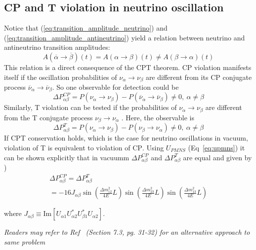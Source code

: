 \subsection{CP and \textsc{T} violation in neutrino oscillation}

Notice that (\ref{eq:transition_amplitude_neutrino}) and (\ref{eq:transition_amplitude_antineutrino}) yield a relation between neutrino and antineutrino transition amplitudes:
\begin{equation}
   A(\overline {\alpha} \to \overline {\beta})(t) =  A(\alpha \to \beta)(t)\not = A(\beta \to \alpha)(t)
\end{equation}
This relation is a direct consequence of the \textsc{CPT} theorem. \textsc{CP} violation manifests itself if the oscillation probabilities of \(\nu _{\alpha} \to \nu _\beta\) are different from its \textsc{CP} conjugate process \(\overline {\nu} _{\alpha} \to \overline {\nu} _\beta\). So one observable for detection could be
\begin{equation}
    \Delta P^{CP} _ {\alpha\beta} = P(\nu _\alpha \to \nu _\beta) - P(\overline {\nu} _{\alpha} \to \overline {\nu} _\beta) \not = 0, ~ \alpha \not = \beta
\end{equation}
Similarly, \textsc{T} violation can be tested if the probabilities of  \(\nu _{\alpha} \to \nu _\beta\)
are different from the  \textsc{T} conjugate process  \(\nu _{\beta} \to \nu _\alpha\) . Here, the observable is
\begin{equation}
    \Delta P^{T} _ {\alpha\beta} = P(\nu _\alpha \to \nu _\beta) - P(\nu _{\beta} \to \nu _\alpha) \not = 0, ~ \alpha \not = \beta
\end{equation}
If \textsc{CPT} conservation holds, which is the case for neutrino oscillations in vacuum, violation of \textsc{T}  is equivalent to violation of \textsc{CP}. Using \(U_{PMNS}\) (Eq~\ref{eq:upmns}) it can be shown explicitly that in vacuumm \(\Delta P^{CP} _ {\alpha\beta}\) and \(\Delta P^{T} _ {\alpha\beta}\) are equal and given by \cite{zuber2020neutrino})
\begin{equation}
    \begin{gathered}
        \Delta P^{CP} _ {\alpha\beta} = \Delta P^{T} _ {\alpha\beta}\\
        = - 16 J_{\alpha\beta} \sin \left(\frac{\Delta m^2 _{12}}{4E} L\right)\sin \left(\frac{\Delta m^2 _{23}}{4E} L\right)\sin \left(\frac{\Delta m^2 _{13}}{4E} L\right)
    \end{gathered}
\end{equation}

where \(J_{\alpha\beta} \equiv \mathrm{Im}[U_{\alpha 1}U^*_{\alpha 2}U^*_{\beta 1}U_{\alpha 2}]\). 

\textit{Readers may refer to Ref~ (Section 7.3, pg. 31-32) for an alternative approach to same problem}